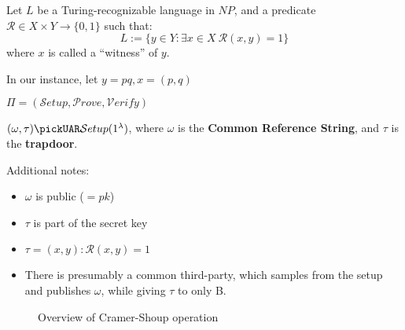 Let $L$ be a Turing-recognizable language in $NP$, and a predicate $\mathcal{R} \in X \times Y \to \{0, 1\}$ such that:
\begin{equation*}
    L := \{y \in Y : \exists x \in X \: \mathcal{R}(x, y) = 1\}
\end{equation*}
where $x$ is called a ``witness'' of $y$.

In our instance, let $y = pq, x = (p,q)$

$\Pi = (\mathcal{S}etup, \mathcal{P}rove, \mathcal{V}erify)$

$(\omega, \tau) \pickUAR \mathcal{S}etup(1^\lambda)$, where $\omega$ is the \textbf{Common Reference String}, and $\tau$ is the \textbf{trapdoor}.

Additional notes:
\begin{itemize}
    \item $\omega$ is public ($ = pk$)
    \item $\tau$ is part of the secret key
    \item $\tau = (x, y) : \mathcal{R}(x, y) = 1$ %
    \item There is presumably a common third-party, which samples from the setup and publishes $\omega$, while giving $\tau$ to only B. %
\end{itemize}

\begin{figure}[h!]
    \centering
    \sdinit{}
    \caption{Overview of Cramer-Shoup operation}
    \label{seq:csoverview}
\end{figure}

